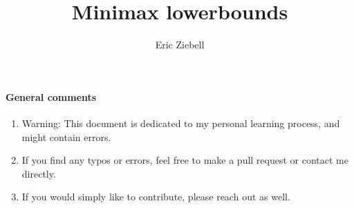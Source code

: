\documentclass[a4paper]{article}
\author{Eric Ziebell}
\title{Minimax lowerbounds}
\begin{document}
\maketitle

\paragraph{General comments}
\begin{enumerate}
	\item Warning: This document is dedicated to my personal learning process, and might contain errors.
	\item If you find any typos or errors, feel free to make a pull request or contact me directly.
	\item If you would simply like to contribute, please reach out as well.
\end{enumerate}
\end{document}
